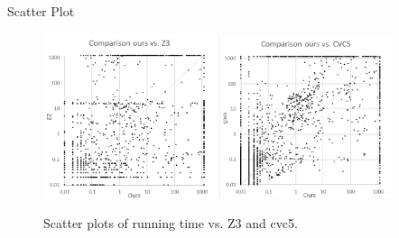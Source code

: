 \begin{frame}{Scatter Plot}
    \begin{figure}
        \centering
        \includegraphics[width=0.45\textwidth]{scatter_z3b.png}\qquad
        \includegraphics[width=0.45\textwidth]{scatter_cvc5b.png}
        \caption{Scatter plots of running time vs. Z3 and cvc5.}
        \label{fig:scatter_plots}
    \end{figure}
\end{frame}

